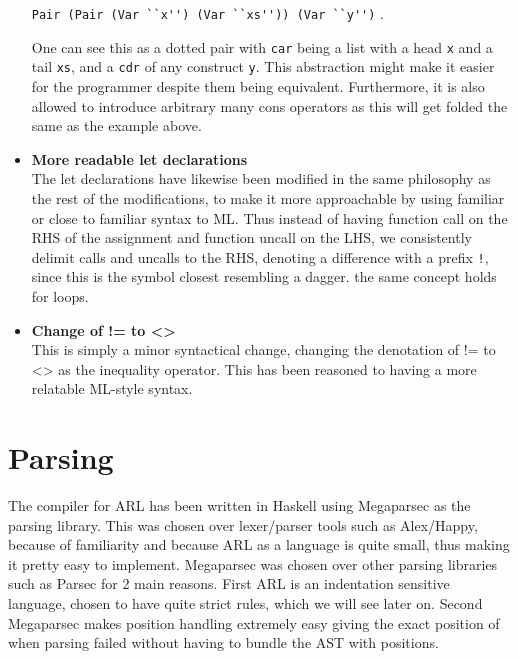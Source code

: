 \documentclass[a4paper]{article}
\begin{document}
\begin{itemize}
\verb+Pair (Pair (Var ``x'') (Var ``xs'')) (Var ``y'')+ .

One can see this as a dotted pair with \texttt{car} being a list with a head \texttt{x} and a tail \texttt{xs}, and a \texttt{cdr} of any construct \texttt{y}. This abstraction might make it easier for the programmer despite them being equivalent. Furthermore, it is also allowed to introduce arbitrary many cons operators as this will get folded the same as the example above.
\item \textbf{More readable let declarations}\\
The let declarations have likewise been modified in the same philosophy as the rest of the modifications, to make it more approachable by using familiar or close to familiar syntax to ML. Thus instead of having function call on the RHS of the assignment and function uncall on the LHS, we consistently delimit calls and uncalls to the RHS, denoting a difference with a prefix \texttt{!}, since this is the symbol closest resembling a dagger. the same concept holds for loops.
\item \textbf{Change of != to <>}\\
This is simply a minor syntactical change, changing the denotation of != to <> as the inequality operator. This has been reasoned to having a more relatable ML-style syntax.
\end{itemize}

\section{Parsing}
\label{sec:org97da5c1}
The compiler for ARL has been written in Haskell using Megaparsec as the parsing library. This was chosen over lexer/parser tools such as Alex/Happy, because of familiarity and because ARL as a language is quite small, thus making it pretty easy to implement. Megaparsec was chosen over other parsing libraries such as Parsec for 2 main reasons. First ARL is an indentation sensitive language, chosen to have quite strict rules, which we will see later on. Second Megaparsec makes position handling extremely easy giving the exact position of when parsing failed without having to bundle the AST with positions.
\end{document}
